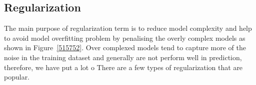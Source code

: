 \subsection{Regularization}

The main purpose of regularization term is to reduce model complexity and help to avoid model overfitting problem by penalising the overly complex models as shown in Figure~\ref{515752}. Over complexed models tend to capture more of the noise in the training dataset and generally are not perform well in prediction, therefore, we have put a lot o There are a few types of regularization that are popular. 